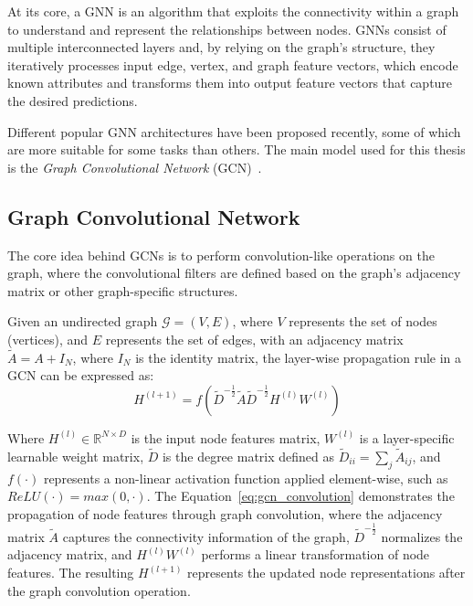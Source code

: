 \documentclass[11pt,a4paper,twocolumn]{article}
\begin{document}
At its core, a GNN is an algorithm that exploits the connectivity within a graph to understand and represent the relationships between nodes.
GNNs consist of multiple interconnected layers and, by relying on the graph's structure, they iteratively processes input edge, vertex, and graph feature vectors, which encode known attributes and transforms them into output feature vectors that capture the desired predictions.

Different popular GNN architectures have been proposed recently, some of which are more suitable for some tasks than others.
The main model used for this thesis is the \textit{Graph Convolutional Network} (GCN)~\cite{DBLP:journals/corr/KipfW16}.

\subsection{Graph Convolutional Network}
\label{subsec:background}%

The core idea behind GCNs is to perform convolution-like operations on the graph, where the convolutional filters are defined based on the graph's adjacency matrix or other graph-specific structures.

Given an undirected graph $\mathcal{G} = (V, E)$, where $V$ represents the set of nodes (vertices), and $E$ represents the set of edges, with an adjacency matrix $\tilde{A}=A+I_N$, where $I_N$ is the identity matrix, the layer-wise propagation rule in a GCN can be expressed as:
\begin{equation}
    \label{eq:gcn_convolution}
    H^{(l+1)} = f \left( \tilde{D}^{-\tfrac{1}{2}}  \tilde{A}  \tilde{D}^{-\tfrac{1}{2}}  H^{(l)}  W^{(l)} \right)
\end{equation}

Where $H^{(l)} \in \mathbb{R} ^{N \times D}$ is the input node features matrix, $W^{(l)}$ is a layer-specific learnable weight matrix, $\tilde{D}$ is the degree matrix defined as $\tilde{D}_{ii} = \sum_{j} \tilde{A}_{ij}$, and $f(\cdot)$ represents a non-linear activation function applied element-wise, such as $ReLU(\cdot) = max(0, \cdot)$.
The Equation~\ref{eq:gcn_convolution} demonstrates the propagation of node features through graph convolution, where the adjacency matrix $\tilde{A}$ captures the connectivity information of the graph, $\tilde{D}^{-\tfrac{1}{2}}$ normalizes the adjacency matrix, and $H^{(l)}  W^{(l)}$ performs a linear transformation of node features.
The resulting $H^{(l+1)}$ represents the updated node representations after the graph convolution operation.
\end{document}
